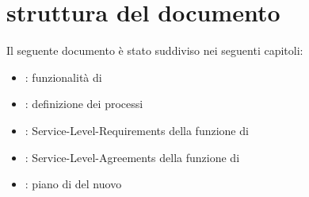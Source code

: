 %
%
\section[Struttura del documento]{struttura del documento}
\label{abs-document-structure}
Il seguente documento è stato suddiviso nei seguenti capitoli:

\begin{itemize}
\item{: funzionalità di }
\item{: definizione dei processi}
\item{: \ac{Service-Level-Requirements} della funzione di }
\item{: \ac{Service-Level-Agreements} della funzione di }
\item{: piano di  del nuovo }
\end{itemize}